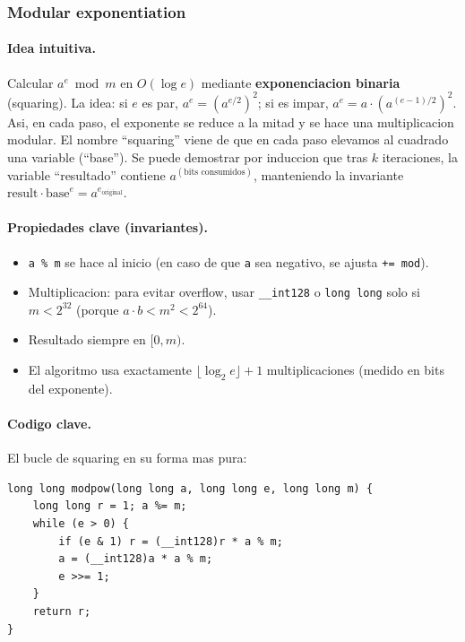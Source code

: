 ﻿\subsubsection{Modular exponentiation}

\paragraph{Idea intuitiva.}
Calcular $a^e \bmod m$ en $O(\log e)$ mediante \textbf{exponenciacion binaria} (squaring). La idea: si $e$ es par, $a^e = (a^{e/2})^2$; si es impar, $a^e = a \cdot (a^{(e-1)/2})^2$. Asi, en cada paso, el exponente se reduce a la mitad y se hace una multiplicacion modular. El nombre ``squaring'' viene de que en cada paso elevamos al cuadrado una variable (``base''). Se puede demostrar por induccion que tras $k$ iteraciones, la variable ``resultado'' contiene $a^{(\text{bits consumidos})}$, manteniendo la invariante $\text{result} \cdot \text{base}^e = a^{e_{\text{original}}}$.

\paragraph{Propiedades clave (invariantes).}
\begin{itemize}\setlength\itemsep{0pt}
	\item \texttt{a \% m} se hace al inicio (en caso de que \texttt{a} sea negativo, se ajusta \texttt{+= mod}).
	\item Multiplicacion: para evitar overflow, usar \texttt{\_\_int128} o \texttt{long long} solo si $m < 2^{32}$ (porque $a \cdot b < m^2 < 2^{64}$).
	\item Resultado siempre en $[0, m)$.
	\item El algoritmo usa exactamente $\lfloor \log_2 e \rfloor + 1$ multiplicaciones (medido en bits del exponente).
\end{itemize}

\paragraph{Codigo clave.}
El bucle de squaring en su forma mas pura:
\begin{verbatim}
long long modpow(long long a, long long e, long long m) {
    long long r = 1; a %= m;
    while (e > 0) {
        if (e & 1) r = (__int128)r * a % m;
        a = (__int128)a * a % m;
        e >>= 1;
    }
    return r;
}
\end{verbatim}

